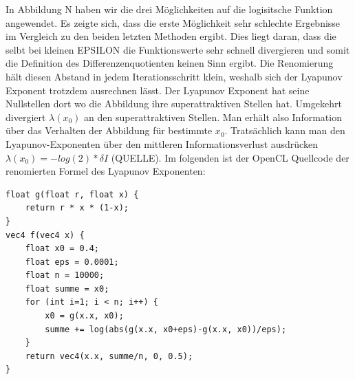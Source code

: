 \documentclass{scrartcl}
\begin{document}
In Abbildung N haben wir die drei Möglichkeiten auf die logisitsche Funktion angewendet. Es zeigte sich, dass die erste Möglichkeit sehr schlechte Ergebnisse im Vergleich zu den beiden letzten Methoden ergibt. Dies liegt daran, dass die selbt bei kleinen EPSILON die Funktionswerte sehr schnell divergieren und somit die Definition des Differenzenquotienten keinen Sinn ergibt. Die Renomierung hält diesen Abstand in jedem Iterationsschritt klein, weshalb sich der Lyapunov Exponent trotzdem ausrechnen lässt.
Der Lyapunov Exponent hat seine Nullstellen dort wo die Abbildung ihre superattraktiven Stellen hat. Umgekehrt divergiert $\lambda(x_0)$ an den superattraktiven Stellen. Man erhält also Information über das Verhalten der Abbildung für bestimmte $x_0$. Tratsächlich kann man den Lyapunov-Exponenten über den mittleren Informationsverlust ausdrücken $\lambda(x_0)=-log(2)*\delta I$ (QUELLE). Im folgenden ist der OpenCL Quellcode der renomierten Formel des Lyapunov Exponenten:
\begin{lstlisting}
float g(float r, float x) {
    return r * x * (1-x);
}
vec4 f(vec4 x) {
    float x0 = 0.4;
    float eps = 0.0001;
    float n = 10000;
    float summe = x0;
    for (int i=1; i < n; i++) {
        x0 = g(x.x, x0);
        summe += log(abs(g(x.x, x0+eps)-g(x.x, x0))/eps);
    }
    return vec4(x.x, summe/n, 0, 0.5);
}
\end{lstlisting}
\end{document}
